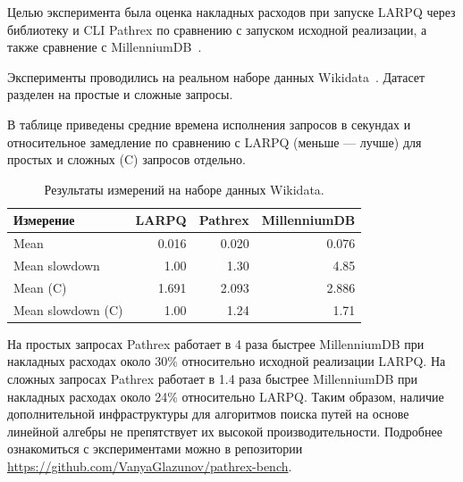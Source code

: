 \documentclass[a4paper]{article}
\begin{document}

Целью эксперимента была оценка накладных расходов при запуске LARPQ через библиотеку и CLI Pathrex по сравнению с запуском исходной реализации,
а также сравнение с MillenniumDB~\cite{mdb}.

Эксперименты проводились на реальном наборе данных Wikidata~\cite{wikidata}. Датасет разделен на простые и сложные запросы.

В таблице приведены средние времена исполнения запросов в секундах и относительное замедление по сравнению с LARPQ
(меньше --- лучше) для простых и сложных (C) запросов отдельно.

\begin{table}[h]
    \def\arraystretch{1.1}
    \setlength\tabcolsep{0.4em}
    \centering
    \small
    \caption{Результаты измерений на наборе данных Wikidata.}
    \begin{tabular}{l|r|r|r}
        \toprule
        Измерение & LARPQ & Pathrex & MillenniumDB \\
        \midrule
        Mean & 0.016 & 0.020 & 0.076 \\
        \midrule
        Mean slowdown & 1.00 & 1.30 & 4.85 \\
        \midrule
        Mean (C) & 1.691 & 2.093 & 2.886 \\
        \midrule
        Mean slowdown (C) & 1.00 & 1.24 & 1.71 \\
        \bottomrule
    \end{tabular}
\end{table}

На простых запросах Pathrex работает в 4 раза быстрее MillenniumDB при накладных расходах около 30\% относительно исходной реализации LARPQ.
На сложных запросах Pathrex работает в 1.4 раза быстрее MillenniumDB при накладных расходах около 24\% относительно LARPQ.
Таким образом, наличие дополнительной инфраструктуры для алгоритмов поиска путей на основе линейной алгебры не препятствует их высокой производительности.
Подробнее ознакомиться с экспериментами можно в репозитории \url{https://github.com/VanyaGlazunov/pathrex-bench}.

\pagebreak
\end{document}
